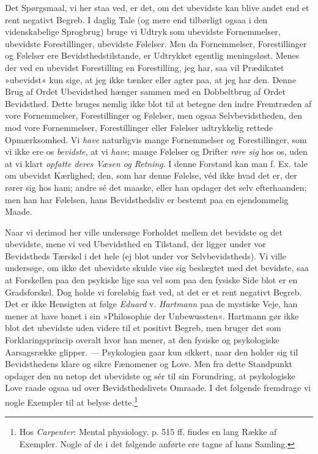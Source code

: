 \documentclass[12pt,a4paper,openany]{book}
\newcommand{\opage}[1]{\marginnote{\footnotesize\textit{[#1]}}}
\begin{document}
Det Spørgsmaal, vi her staa ved, er det, om det ubevidste kan blive
andet end et rent negativt Begreb. I daglig Tale (og mere end tilbørligt
ogsaa i den videnskabelige Sprogbrug) bruge vi Udtryk som ubevidste
Fornemmelser, ubevidste Forestillinger, ubevidste Følelser. Men da
Fornemmelser, Forestillinger og Følelser ere Bevidsthedstilstande, er
Udtrykket egentlig meningsløst. Menes der ved en ubevidst Forestilling
en Forestilling, jeg har, saa vil Prædikatet »ubevidst« kun sige, at jeg
ikke tænker eller agter paa, at jeg har den. Denne Brug af Ordet
Ubevidsthed hænger sammen med en Dobbeltbrug af Ordet Bevidsthed. Dette
bruges nemlig ikke blot til at betegne den indre Fremtræden af vore
Fornemmelser, Forestillinger og Følelser, men ogsaa Selvbevidstheden,
den mod vore Fornemmelser, Forestillinger eller Følelser udtrykkelig
rettede Opmærksomhed. Vi \emph{have} naturligvis mange Fornemmelser og
Forestillinger, som vi ikke ere os \emph{bevidste}, at vi \emph{have};
mange Følelser og Drifter \emph{røre sig} hos os, uden at vi klart
\emph{opfatte deres Væsen og Retning}. I denne Forstand kan man f. Ex.
tale om ubevidst Kærlighed; den, som har denne Følelse, véd ikke hvad
det er, der rører sig hos ham; andre sé det maaske, eller han opdager
det selv efterhaanden; men han har Følelsen, hans Bevidsthedsliv er
bestemt paa en ejendommelig Maade.

Naar vi derimod her ville undersøge Forholdet mellem det bevidste og det
ubevidste, mene vi ved Ubevidsthed en Tilstand, der ligger under vor
Bevidstheds Tærskel i det hele (ej blot under vor Selvbevidstheds). Vi
ville undersøge, om ikke det ubevidste
\opage{87}skulde vise sig beslægtet med det bevidste, saa at Forskellen
paa den psykiske lige saa vel som paa den fysiske Side blot er en
Gradsforskel. Dog holde vi foreløbig fast ved, at det er et rent
negativt Begreb. Det er ikke Hensigten at følge \emph{Eduard} v.
\emph{Hartmann} paa de mystiske Veje, han mener at have banet i sin
»Philosophie der Unbewussten«. Hartmann gør ikke blot det ubevidste uden
videre til et positivt Begreb, men bruger det som Forklaringsprincip
overalt hvor han mener, at den fysiske og psykologiske Aarsagsrække
glipper. --- Psykologien gaar kun sikkert, naar den holder sig til
Bevidsthedens klare og sikre Fænomener og Love. Men fra dette Standpunkt
opdager den nu netop det ubevidste og sér til sin Forundring, at
psykologiske Love raade ogsaa ud over Bevidsthedslivets Omraade. I det
følgende fremdrage vi nogle Exempler til at belyse
dette.\footnote[1]{Hos \emph{Carpenter}: Mental physiology. p. 515 ff.
findes en lang Række af Exempler. Nogle af de i det følgende anførte ere
tagne af hans Samling.}
\end{document}
